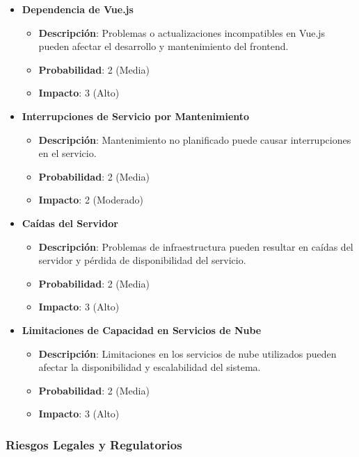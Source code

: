 \documentclass{article}
\begin{document}
\begin{itemize}
    \item \textbf{Dependencia de Vue.js}
          \begin{itemize}
              \item \textbf{Descripción}: Problemas o actualizaciones incompatibles en Vue.js pueden afectar el desarrollo y mantenimiento del frontend.
              \item \textbf{Probabilidad}: 2 (Media)
              \item \textbf{Impacto}: 3 (Alto)
          \end{itemize}

    \item \textbf{Interrupciones de Servicio por Mantenimiento}
          \begin{itemize}
              \item \textbf{Descripción}: Mantenimiento no planificado puede causar interrupciones en el servicio.
              \item \textbf{Probabilidad}: 2 (Media)
              \item \textbf{Impacto}: 2 (Moderado)
          \end{itemize}

    \item \textbf{Caídas del Servidor}
          \begin{itemize}
              \item \textbf{Descripción}: Problemas de infraestructura pueden resultar en caídas del servidor y pérdida de disponibilidad del servicio.
              \item \textbf{Probabilidad}: 2 (Media)
              \item \textbf{Impacto}: 3 (Alto)
          \end{itemize}

    \item \textbf{Limitaciones de Capacidad en Servicios de Nube}
          \begin{itemize}
              \item \textbf{Descripción}: Limitaciones en los servicios de nube utilizados pueden afectar la disponibilidad y escalabilidad del sistema.
              \item \textbf{Probabilidad}: 2 (Media)
              \item \textbf{Impacto}: 3 (Alto)
          \end{itemize}
\end{itemize}

\subsubsection{Riesgos Legales y Regulatorios}
\end{document}
